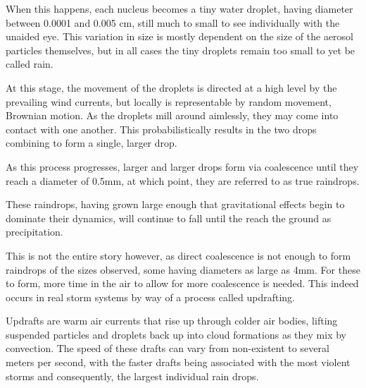 \documentclass[twocolumn,a4paper,10pt]{article}
\begin{document}
When this happens, each nucleus becomes a tiny water droplet, having diameter
between 0.0001 and 0.005 cm, still much to small to see individually with the
unaided eye. This variation in size is mostly dependent on the size of the
aerosol particles themselves, but in all cases the tiny droplets remain too
small to yet be called rain.

At this stage, the movement of the droplets is directed at a high level by the
prevailing wind currents, but locally is representable by random movement,
Brownian motion. As the droplets mill around aimlessly, they may come into
contact with one another. This probabilistically results in the two drops
combining to form a single, larger drop.

As this process progresses, larger and larger drops form via coalescence until
they reach a diameter of 0.5mm, at which point, they are referred to as
true raindrops.

These raindrops, having grown large enough that gravitational effects begin to
dominate their dynamics, will continue to fall until the reach the ground as
precipitation.

This is not the entire story however, as direct coalescence is not enough to
form raindrops of the sizes observed, some having diameters as large as 4mm. For
these to form, more time in the air to allow for more coalescence is needed.
This indeed occurs in real storm systems by way of a process called updrafting.

Updrafts are warm air currents that rise up through colder air bodies, lifting
suspended particles and droplets back up into cloud formations as they mix by
convection. The speed of these drafts can vary from non-existent to several
meters per second, with the faster drafts being associated with the most violent
storms and consequently, the largest individual rain drops.
\end{document}

